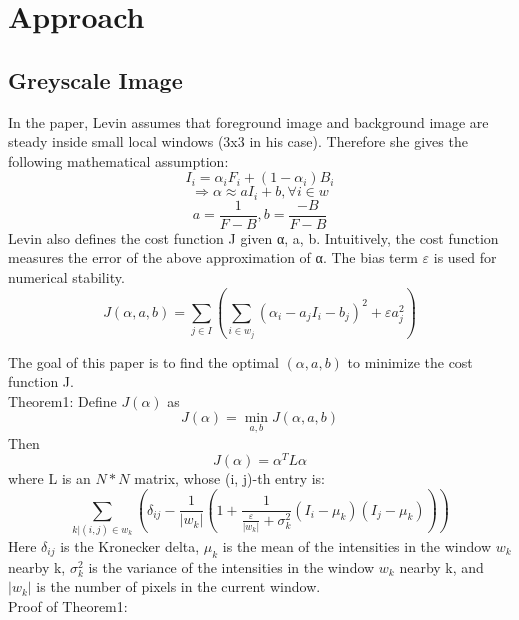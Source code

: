 \documentclass[11pt,letterpaper]{article}
\begin{document}
\section{Approach}
\subsection{Greyscale Image}
In the paper, Levin assumes that foreground image and background image are steady inside small local windows (3x3 in his case). Therefore she gives the following mathematical assumption:
$$I_i = \alpha_i F_i + (1 - \alpha_i)B_i$$
$$\Rightarrow \alpha \approx aI_{i} + b, \forall i \in w $$
$$a = \frac{1}{F-B}, b = \frac{-B}{F-B} $$
Levin also defines the cost function J given α, a, b. Intuitively, the cost function measures the error of the above approximation of α. The bias term $\varepsilon$ is used for numerical stability.
$$J(\alpha, a, b) = \sum_{j \in I}(\sum_{i \in w_j}(\alpha_i - a_jI_i-b_j)^2+\varepsilon a_j^2)$$

The goal of this paper is to find the optimal $(\alpha, a, b)$ to minimize the cost function J.\\

Theorem1: Define $J(\alpha)$ as 
$$J(\alpha) = \min_{a,b} J(\alpha, a, b)$$
Then
$$J(\alpha) = \alpha^T L \alpha$$
where L is an $N * N$ matrix, whose (i, j)-th entry is:
$$\sum_{k|(i, j) \in w_k}(\delta_{ij} - \frac{1}{|w_k|}(1+\frac{1}{\frac{\varepsilon}{|w_k|} + \sigma_k^2}(I_i - \mu_k)(I_j - \mu_k)))$$
Here $\delta_{ij}$ is the Kronecker delta, $\mu_k$ is the mean of the intensities in the window $w_k$  nearby k, $\sigma_k^2$ is the variance of the intensities in the window $w_k$  nearby k, and $|w_k|$ is the number of pixels in the current window. \\

Proof of Theorem1:\\
\end{document}
